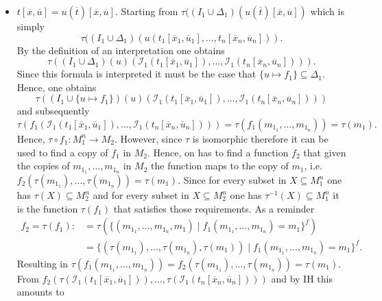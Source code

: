 \documentclass[11pt,a4paper]{article}
\begin{document}
\begin{itemize}[leftmargin=*]
\item  $t[\overline{x},\overline{u}]=u(\overline{t})[\overline{x},\overline{u}]$. Starting from $\tau((I_1 \cup \Delta_1)(u(\overline{t})[\overline{x},\overline{u}])$ which is simply 
\begin{equation*}
\tau((I_1 \cup \Delta_1)(u(t_1[\overline{x}_1,\overline{u}_1], \dots, t_n[\overline{x}_n,\overline{u}_n])).
\end{equation*}
By the definition of an interpretation one obtains 
\begin{equation*}
\tau((I_1 \cup \Delta_1)(u)(\mathcal{I}_1(t_1[\overline{x}_1,\overline{u}_1]), \dots, \mathcal{I}_1(t_n[\overline{x}_n,\overline{u}_n]))).
\end{equation*}
Since this formula is interpreted it must be the case that $\{u \mapsto f_1\} \subseteq \Delta_1$.
Hence, one obtains 
\begin{equation*}
\tau((I_1 \cup \{u \mapsto f_1\})(u)(\mathcal{I}_1(t_1[\overline{x}_1,\overline{u}_1]), \dots, \mathcal{I}_1(t_n[\overline{x}_n,\overline{u}_n])))
\end{equation*}
and subsequently 
\begin{equation*}
\tau(f_1(\mathcal{I}_1(t_1[\overline{x}_1,\overline{u}_1]), \dots, \mathcal{I}_1(t_n[\overline{x}_n,\overline{u}_n]))) = \tau(f_1(m_{1_1} , \dots , m_{1_n})) = \tau(m_1).
\end{equation*}
Hence, $\tau \circ f_1 : M_1^n \to M_2$. However, since $\tau$ is isomorphic therefore it can be used to find a copy of $f_1$ in $M_2$. Hence, on has to find a function $f_2$ that given the copies of $m_{1_1} , \dots , m_{1_n}$ in $M_2$ the function maps to the copy of $m_1$, i.e. $f_2(\tau(m_{1_1}) , \dots , \tau(m_{1_n}))=\tau(m_1)$. Since for every subset in $X \subseteq M_1^n$ one has $\tau(X) \subseteq M_2^n$ and for every subset in $X \subseteq M_2^n$ one has $\tau^{-1}(X) \subseteq M_1^n$ it is the function $\tau(f_1)$ that satisfies those requirements. As a reminder 
\begin{equation*}
\begin{split}
f_2=\tau(f_1):&=\tau(\{(m_{1_1} , \dots , m_{1_n}, m_1) \mid f_1(m_{1_1} , \dots , m_{1_n})=m_1\}^{f})\\
&=\{(\tau(m_{1_1}) , \dots , \tau(m_{1_n}),\tau(m_1)) \mid f_1(m_{1_1} , \dots , m_{1_n})=m_1\}^{f}.
\end{split}
\end{equation*}
Resulting in $\tau(f_1(m_{1_1} , \dots , m_{1_n})) = f_2(\tau(m_{1_1}) , \dots , \tau(m_{1_n}))=\tau(m_1)$. From $f_2(\tau(\mathcal{I}_1(t_1[\overline{x}_1,\overline{u}_1])) , \dots , \tau(\mathcal{I}_1(t_n[\overline{x}_n,\overline{u}_n])))$ and by IH this amounts to

\end{itemize}
\end{document}
